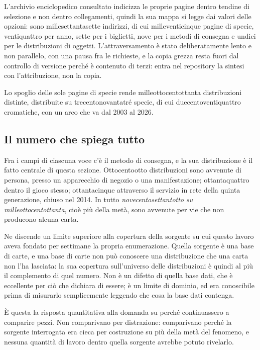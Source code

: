 L'archivio enciclopedico consultato indicizza le proprie pagine dentro tendine di selezione e non dentro collegamenti, quindi la sua mappa si legge dai valori delle opzioni: sono millesettantasette indirizzi, di cui milleventicinque pagine di specie, ventiquattro per anno, sette per i biglietti, nove per i metodi di consegna e undici per le distribuzioni di oggetti. L'attraversamento è stato deliberatamente lento e non parallelo, con una pausa fra le richieste, e la copia grezza resta fuori dal controllo di versione perché è contenuto di terzi: entra nel repository la sintesi con l'attribuzione, non la copia.

Lo spoglio delle sole pagine di specie rende milleottocentottanta distribuzioni distinte, distribuite su trecentonovantatré specie, di cui duecentoventiquattro cromatiche, con un arco che va dal 2003 al 2026.

\subsection{Il numero che spiega tutto}

Fra i campi di ciascuna voce c'è il metodo di consegna, e la sua distribuzione è il fatto centrale di questa sezione. Ottocentootto distribuzioni sono avvenute di persona, presso un apparecchio di negozio o una manifestazione; ottantaquattro dentro il gioco stesso; ottantacinque attraverso il servizio in rete della quinta generazione, chiuso nel 2014. In tutto \emph{novecentosettantotto su milleottocentottanta}, cioè più della metà, sono avvenute per vie che non producono alcuna carta.

Ne discende un limite superiore alla copertura della sorgente su cui questo lavoro aveva fondato per settimane la propria enumerazione. Quella sorgente è una base di carte, e una base di carte non può conoscere una distribuzione che una carta non l'ha lasciata: la sua copertura sull'universo delle distribuzioni è quindi al più il complemento di quel numero. Non è un difetto di quella base dati, che è eccellente per ciò che dichiara di essere; è un limite di dominio, ed era conoscibile prima di misurarlo semplicemente leggendo che cosa la base dati contenga.

È questa la risposta quantitativa alla domanda su perché continuassero a comparire pezzi. Non comparivano per distrazione: comparivano perché la sorgente interrogata era cieca per costruzione su più della metà del fenomeno, e nessuna quantità di lavoro dentro quella sorgente avrebbe potuto rivelarlo.

